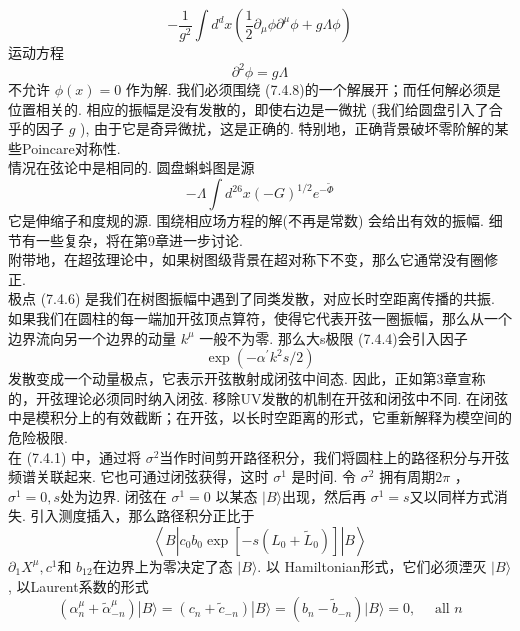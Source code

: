 \begin{equation}
	-\frac{1}{g^{2}} \int d^{d} x\left(\frac{1}{2} \partial_{\mu} \phi \partial^{\mu} \phi+g \Lambda \phi\right)
\end{equation}
运动方程
\begin{equation}
	\partial^{2} \phi=g \Lambda
\end{equation}
不允许 $\phi(x)=0$ 作为解. 我们必须围绕 (7.4.8)的一个解展开；而任何解必须是位置相关的. 相应的振幅是没有发散的，即使右边是一微扰 (我们给圆盘引入了合乎的因子 $g$ ), 由于它是奇异微扰，这是正确的. 特别地，正确背景破坏零阶解的某些Poincare对称性.\\
情况在弦论中是相同的. 圆盘蝌蚪图是源
\begin{equation}
	-\Lambda \int d^{26} x(-G)^{1 / 2} e^{-\tilde{\Phi}}
\end{equation}
它是伸缩子和度规的源. 围绕相应场方程的解(不再是常数) 会给出有效的振幅. 细节有一些复杂，将在第9章进一步讨论.\\
附带地，在超弦理论中，如果树图级背景在超对称下不变，那么它通常没有圈修正.\\
极点 (7.4.6) 是我们在树图振幅中遇到了同类发散，对应长时空距离传播的共振. 如果我们在圆柱的每一端加开弦顶点算符，使得它代表开弦一圈振幅，那么从一个边界流向另一个边界的动量 $k^{\mu}$ 一般不为零. 那么大s极限 (7.4.4)会引入因子
\begin{equation}
	\exp \left(-\alpha^{\prime} k^{2} s / 2\right)
\end{equation}
发散变成一个动量极点，它表示开弦散射成闭弦中间态. 因此，正如第3章宣称的，开弦理论必须同时纳入闭弦. 移除UV发散的机制在开弦和闭弦中不同. 在闭弦中是模积分上的有效截断；在开弦，以长时空距离的形式，它重新解释为模空间的危险极限.\\
在 (7.4.1) 中，通过将 $\sigma^{2}$当作时间剪开路径积分，我们将圆柱上的路径积分与开弦频谱关联起来. 它也可通过闭弦获得，这时 $\sigma^{1}$ 是时间. 令 $\sigma^{2}$ 拥有周期$2 \pi$ ，$\sigma^{1}=0, s$处为边界. 闭弦在 $\sigma^{1}=0$ 以某态 $|B\rangle$出现，然后再 $\sigma^{1}=s $又以同样方式消失. 引入测度插入，那么路径积分正比于
\begin{equation}
	\left\langle B\left|c_{0} b_{0} \exp \left[-s\left(L_{0}+\tilde{L}_{0}\right)\right]\right| B\right\rangle
\end{equation}
$\partial_{1} X^{\mu}, c^{1}$和 $b_{12}$在边界上为零决定了态 $|B\rangle$. 以 Hamiltonian形式，它们必须湮灭 $|B\rangle$, 以Laurent系数的形式
\begin{equation}
	\left(\alpha_{n}^{\mu}+\tilde{\alpha}_{-n}^{\mu}\right)|B\rangle=\left(c_{n}+\tilde{c}_{-n}\right)|B\rangle=\left(b_{n}-\tilde{b}_{-n}\right)|B\rangle=0, \quad \text { all } n
\end{equation}
